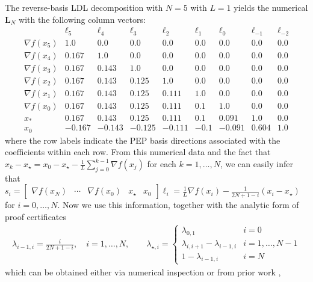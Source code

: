\documentclass{article}
\theoremstyle{definition}
\theoremstyle{plain}
\newcommand{\vL}{{\mathbf{L}}}
\begin{document}
The reverse-basis LDL decomposition with $N=5$ with $L=1$ yields the numerical $\vL_N$ with the following column vectors:
\[
\begin{array}{c|rrrrrrrr}
 & \boldsymbol{\ell}_5 & \boldsymbol{\ell}_4 & \boldsymbol{\ell}_3 & \boldsymbol{\ell}_2 & \boldsymbol{\ell}_1 & \boldsymbol{\ell}_0 & \boldsymbol{\ell}_{-1} & \boldsymbol{\ell}_{-2} \\
\hline
\nabla f(x_5) & 1.0   & 0.0   & 0.0   & 0.0   & 0.0 & 0.0   & 0.0   & 0.0 \\
\nabla f(x_4) & 0.167 & 1.0   & 0.0   & 0.0   & 0.0 & 0.0   & 0.0   & 0.0 \\
\nabla f(x_3) & 0.167 & 0.143 & 1.0   & 0.0   & 0.0 & 0.0   & 0.0   & 0.0 \\
\nabla f(x_2) & 0.167 & 0.143 & 0.125 & 1.0   & 0.0 & 0.0   & 0.0   & 0.0 \\
\nabla f(x_1) & 0.167 & 0.143 & 0.125 & 0.111 & 1.0 & 0.0   & 0.0   & 0.0 \\
\nabla f(x_0) & 0.167 & 0.143 & 0.125 & 0.111 & 0.1 & 1.0   & 0.0   & 0.0 \\
x_*           & 0.167 & 0.143 & 0.125 & 0.111 & 0.1 & 0.091 & 1.0   & 0.0 \\
x_0           & -0.167 & -0.143 & -0.125 & -0.111 & -0.1 & -0.091 & 0.604 & 1.0
\end{array}
\]
where the row labels indicate the PEP basis directions associated with the coefficients within each row.
From this numerical data and the fact that $x_k - x_\star = x_0 - x_\star - \frac{1}{L}\sum_{j=0}^{k-1} \nabla f(x_j)$ for each $k=1,\dots,N$, we can easily infer that $s_i = \begin{bmatrix} \nabla f(x_N) & \cdots & \nabla f(x_0) & x_\star & x_0 \end{bmatrix} \boldsymbol{\ell}_{i} = \frac{1}{L}\nabla f(x_i) - \frac{1}{2N+1-i} (x_i - x_\star)$ for $i=0,\dots,N$.
Now we use this information, together with the analytic form of proof certificates
\begin{align*}
\lambda_{i-1,i} = \frac{i}{2N + 1 - i}, \quad i = 1, \dots, N,
\qquad
\lambda_{\star,i} =
\begin{cases}
\lambda_{0,1} & i = 0 \\
\lambda_{i,i+1} - \lambda_{i-1,i} & i = 1, \dots, N-1 \\
1 - \lambda_{i-1,i} & i = N
\end{cases}
\end{align*}
which can be obtained either via numerical inspection or from prior work \citep{DroriTeboulle2014_performance},
\end{document}
